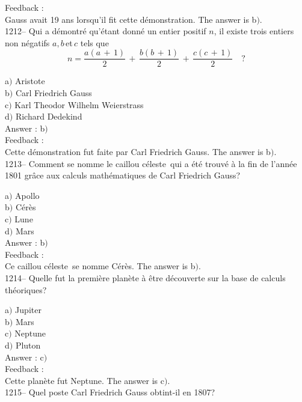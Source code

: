 \documentclass[letterpaper, 12pt]{article}
\begin{document}
Feedback : \\
Gauss avait 19 ans lorsqu'il fit cette d\'emonstration.
The answer is b$)$.\\

1212-- Qui a d\'emontr\'e qu'\'etant donn\'e un entier positif $n$,
il existe trois entiers non n\'egatifs $a,b\,$et$\,c$ tels que
$$\displaystyle{n=\frac{a(a\,+\,1)}2\,+\,\frac{b(b\,+\,1)}2\,+\,\frac{c(c\,+\,1)}2}\quad?$$

a$)$ Aristote \\
b$)$ Carl Friedrich Gauss \\
c$)$ Karl Theodor Wilhelm Weierstrass \\
d$)$ Richard Dedekind\\

Answer : b$)$\\

Feedback : \\
Cette d\'emonstration fut faite par Carl Friedrich Gauss.
The answer is b$)$.\\

1213-- Comment se nomme le \og caillou c\'eleste\fg\ qui a \'et\'e
trouv\'e \`a la fin de l'ann\'ee 1801 gr\^ace aux calculs
math\'ematiques de Carl Friedrich Gauss?

a$)$ Apollo \\
b$)$ C\'er\`es \\
c$)$ Lune \\
d$)$ Mars\\

Answer : b$)$\\

Feedback : \\
Ce \og caillou c\'eleste\fg\ se nomme C\'er\`es.
The answer is b$)$.\\

1214-- Quelle fut la premi\`ere plan\`ete \`a \^etre d\'ecouverte
sur la base de calculs th\'eoriques?

a$)$ Jupiter \\
b$)$ Mars \\
c$)$ Neptune \\
d$)$ Pluton\\

Answer : c$)$\\

Feedback : \\
Cette plan\`ete fut Neptune.
The answer is c$)$.\\

1215-- Quel poste Carl Friedrich Gauss obtint-il en 1807?
\end{document}
